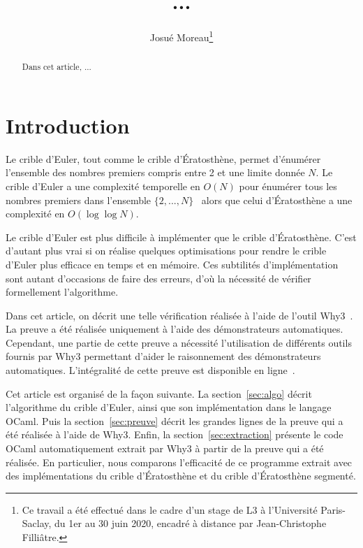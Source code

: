 \documentclass[a4paper]{easychair}
\begin{document}
\title{...}
\author{Josué Moreau\thanks{Ce travail a été effectué dans le cadre
    d'un stage de L3 à l'Université Paris-Saclay, du 1er au 30 juin
    2020, encadré à distance par Jean-Christophe Filliâtre.}}
\maketitle

\begin{abstract}
  Dans cet article, ...
\end{abstract}

\section{Introduction}


Le crible d'Euler, tout comme le crible d'Ératosthène, permet d'énumérer
l'ensemble des nombres premiers compris entre 2 et une limite donnée $N$.
Le crible d'Euler a une complexité temporelle en $O(N)$ pour énumérer tous les
nombres premiers dans l'ensemble $\{2,...,N\}$~\cite{crible-euler} alors que celui
d'Ératosthène a une complexité en $O(\log\log N)$.

Le crible d'Euler est plus difficile à implémenter que le crible d'Ératosthène.
C'est d'autant plus vrai si on réalise quelques optimisations pour
rendre le crible d'Euler plus efficace en temps et en mémoire.
Ces subtilités d'implémentation sont autant d'occasions de faire des erreurs,
d'où la nécessité de vérifier formellement l'algorithme.

Dans cet article, on décrit une telle vérification réalisée à l'aide de
l'outil Why3~\cite{why3}.
La preuve a été réalisée uniquement à l'aide des démonstrateurs automatiques.
Cependant, une partie de cette preuve a nécessité l'utilisation de différents
outils fournis par Why3 permettant d'aider le raisonnement des démonstrateurs
automatiques.
L'intégralité de cette preuve est disponible en ligne~\cite{mapreuve}.

Cet article est organisé de la façon suivante.
La section~\ref{sec:algo} décrit l'algorithme du crible d'Euler, ainsi que son
implémentation dans le langage OCaml.
Puis la section~\ref{sec:preuve} décrit les grandes lignes de la preuve qui a été
réalisée à l'aide de Why3.
Enfin, la section~\ref{sec:extraction} présente le code OCaml
automatiquement extrait par Why3 à partir
de la preuve qui a été réalisée. En particulier, nous comparons l'efficacité de
ce programme extrait avec des implémentations du crible d'Ératosthène et du
crible d'Ératosthène segmenté.
\end{document}
